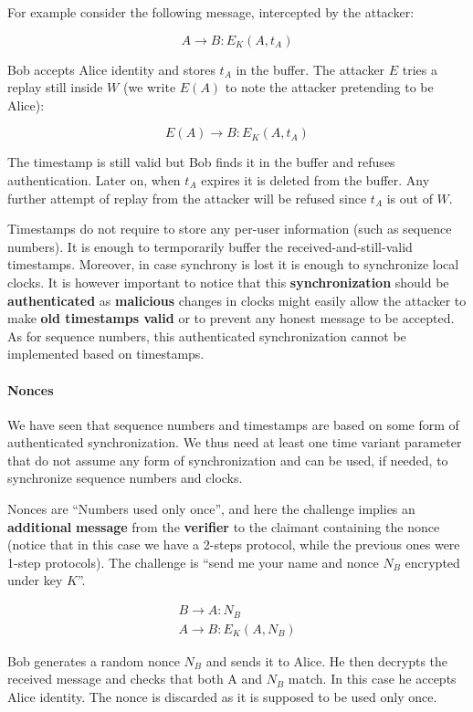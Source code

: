 For example consider the following message, intercepted by the attacker:

$$A \rightarrow B: E_K(A, t_A)$$ 

Bob accepts Alice identity and stores $t_A$ in the buffer. The attacker $E$ tries a replay still inside $W$ (we write $E(A)$ to note the attacker pretending to be Alice):

$$E(A) \rightarrow B: E_K(A, t_A)$$

The timestamp is still valid but Bob finds it in the buffer and refuses authentication. Later on, when $t_A$ expires it is deleted from the buffer. Any further attempt of replay from the attacker will be refused since $t_A$ is out of $W$.

Timestamps do not require to store any per-user information (such as sequence numbers). It is enough to termporarily buffer the received-and-still-valid timestamps. Moreover, in case synchrony is lost it is enough to synchronize local clocks. It is however important to notice that this \textbf{synchronization} should be \textbf{authenticated} as \textbf{malicious} changes in clocks might easily allow the attacker to make \textbf{old timestamps valid} or to prevent any honest message to be accepted. As for sequence numbers, this authenticated synchronization cannot be implemented based on timestamps.

\paragraph{Nonces}
We have seen that sequence numbers and timestamps are based on some form of authenticated synchronization. We thus need at least one time variant parameter that do not assume any form of synchronization and can be used, if needed, to synchronize sequence numbers and clocks. 

Nonces are “Numbers used only once”, and here the challenge implies an \textbf{additional} \textbf{message} from the \textbf{verifier} to the claimant containing the nonce (notice that in this case we have a 2-steps protocol, while the previous ones were 1-step protocols). The challenge is “send me your name and nonce $N_B$ encrypted under key $K$”.

$$\begin{array}{l} B \rightarrow A: N_B\\A \rightarrow B: E_K(A, N_B) \end{array}$$

Bob generates a random nonce $N_B$ and sends it to Alice. He then decrypts the received message and checks that both A and $N_B$ match. In this case he accepts Alice identity. The nonce is discarded as it is supposed to be used only once.

